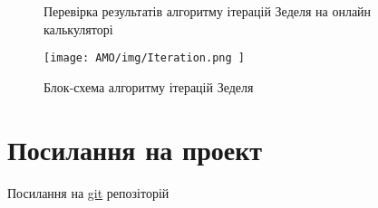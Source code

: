 \documentclass{article}
\begin{document}
\begin{figure}
\centering
{}
\hspace*{\fill} %
\caption{Перевірка результатів алгоритму ітерацій Зеделя на онлайн калькуляторі}
\label{fig:changedMatrixResultChecked}
\end{figure}

\begin{figure}
\centering
\texttt{[image: AMO/img/Iteration.png ]}
\caption{Блок-схема алгоритму ітерацій Зеделя}
\label{fig:zedelfc}
\end{figure}

\section{Посилання на проект}

Посилання на \href{https://github.com/Folainer/university/tree/main/AMO}{git} репозіторій
\end{document}
